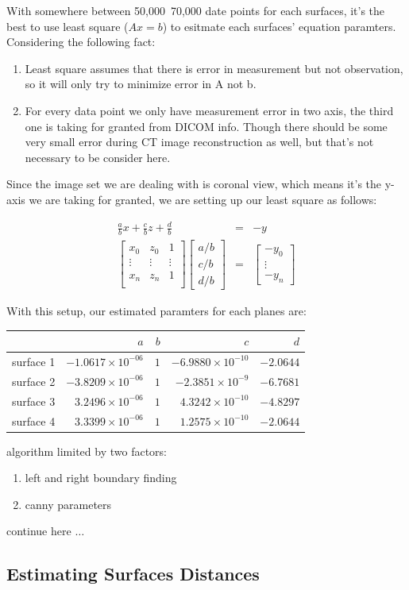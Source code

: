 With somewhere between 50,000~70,000 date points for each surfaces, it's the best to use least square ($Ax=b$) to 
esitmate each surfaces' equation paramters. Considering the following fact:
\begin{enumerate}
  \item Least square assumes that there is error in measurement but not observation, so it will only try to
    minimize error in A not b.
  \item For every data point we only have measurement error in two axis, the third one is taking for granted 
    from DICOM info. Though there should be some very small error during CT image reconstruction as well, but
    that's not necessary to be consider here.
\end{enumerate}
Since the image set we are dealing with is coronal view, which means it's the y-axis we are taking for granted,
we are setting up our least square as follows:

\begin{eqnarray}
\frac{a}{b}x + \frac{c}{b}z + \frac{d}{b} & = & -y \label{eq:x_orient}\\
\begin{bmatrix}
  x_0  & z_0 & 1 \\
  \vdots & \vdots & \vdots \\
  x_n & z_n & 1 \\
\end{bmatrix}
\begin{bmatrix}
a/b\\
c/b\\
d/b
\end{bmatrix}
& = &
\begin{bmatrix}
-y_0 \\
\vdots\\
-y_n
\end{bmatrix}
\end{eqnarray}

With this setup, our estimated paramters for each planes are:

\begin{tabular}{| l || r | r | r | r |}
            \hline
            &               $a$ & $b$ &               $c$ & $d$ \\
            \hline
  surface 1 & $-1.0617\times10^{-06}$ & $1$ & $-6.9880\times10^{-10}$ & $-2.0644$ \\ 
            \hline
  surface 2 & $-3.8209\times10^{-06}$ & $1$ & $-2.3851\times10^{-9}$  & $-6.7681$ \\ 
            \hline
  surface 3 & $3.2496\times10^{-06}$  & $1$ & $4.3242\times10^{-10}$  & $-4.8297$ \\ 
            \hline
  surface 4 & $3.3399\times10^{-06}$  & $1$ & $1.2575\times10^{-10}$  & $-2.0644$ \\ 
            \hline
\end{tabular}

algorithm limited by two factors:
\begin{enumerate}
  \item left and right boundary finding
  \item canny parameters
\end{enumerate}

continue here $\dots$
\subsection{Estimating Surfaces Distances}
